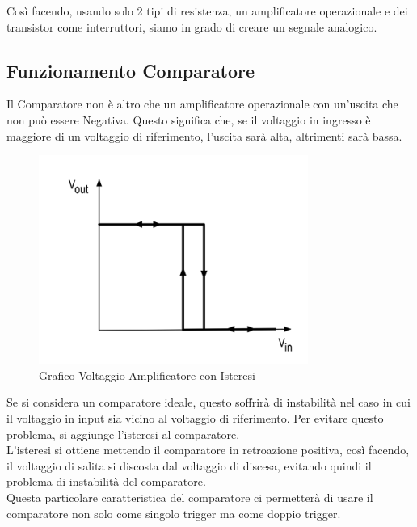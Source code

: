 Così facendo, usando solo 2 tipi di resistenza, un amplificatore operazionale e dei transistor come interruttori, siamo in grado di creare un segnale analogico.\\
\pagebreak
\subsection{Funzionamento Comparatore}
Il Comparatore non è altro che un amplificatore operazionale con un'uscita che non può essere Negativa. Questo significa che, se il voltaggio in ingresso è maggiore di un voltaggio di riferimento, l'uscita sarà alta, altrimenti sarà bassa.\\

\begin{figure}
    \centering
    \includegraphics[width=\linewidth]{microcontrollore/assets/Hysteresis.png}
    \caption{Grafico Voltaggio Amplificatore con Isteresi}
    \label{fig:Comparatore}
\end{figure}

Se si considera un comparatore ideale, questo soffrirà di instabilità nel caso in cui il voltaggio in input sia vicino al voltaggio di riferimento. Per evitare questo problema, si aggiunge l'isteresi al comparatore.\\
L'isteresi si ottiene mettendo il comparatore in retroazione positiva, così facendo, il voltaggio di salita si discosta dal voltaggio di discesa, evitando quindi il problema di instabilità del comparatore.\\

Questa particolare caratteristica del comparatore ci permetterà di usare il comparatore non solo come singolo trigger ma come doppio trigger.\\

